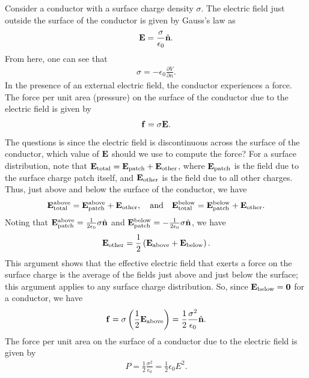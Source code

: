 Consider a conductor with a surface charge density $\sigma$. The electric field just outside the surface of the conductor is given by Gauss's law as
\begin{align}
    \mathbf{E} = \frac{\sigma}{\epsilon_{0}} \hat{\mathbf{n}}.
\end{align}
From here, one can see that
\begin{align}
    \sigma = -\epsilon_{0} \frac{\partial V}{\partial n}.
\end{align}
In the presence of an external electric field, the conductor experiences a force. The force per unit area (pressure) on the surface of the conductor due to the electric field is given by
\begin{align}
    \mathbf{f} = \sigma \mathbf{E}.
\end{align}
The questions is since the electric field is discontinuous across the surface of the conductor, which value of $\mathbf{E}$ should we use to compute the force? For a surface distribution, note that $\mathbf{E}_{\text{total}} = \mathbf{E}_{\text{patch}} + \mathbf{E}_{\text{other}}$, where $\mathbf{E}_{\text{patch}}$ is the field due to the surface charge patch itself, and $\mathbf{E}_{\text{other}}$ is the field due to all other charges. Thus, just above and below the surface of the conductor, we have
\begin{align}
    \mathbf{E}_{\text{total}}^{\text{above}} = \mathbf{E}_{\text{patch}}^{\text{above}} + \mathbf{E}_{\text{other}}, \quad \text{and} \quad \mathbf{E}_{\text{total}}^{\text{below}} = \mathbf{E}_{\text{patch}}^{\text{below}} + \mathbf{E}_{\text{other}}.
\end{align}
Noting that $\mathbf{E}_{\text{patch}}^{\text{above}} = \frac{1}{2\epsilon_{0}} \sigma \hat{\mathbf{n}}$ and $\mathbf{E}_{\text{patch}}^{\text{below}} = - \frac{1}{2\epsilon_{0}} \sigma \hat{\mathbf{n}}$, we have
\begin{align}
    \mathbf{E}_{\text{other}} = \frac{1}{2} \left( \mathbf{E}_{\text{above}} + \mathbf{E}_{\text{below}} \right).
\end{align}
This argument shows that the effective electric field that exerts a force on the surface charge is the average of the fields just above and just below the surface; this argument applies to any surface charge distribution. So, since $\mathbf{E}_{\text{below}} = \mathbf{0}$ for a conductor, we have
\begin{align}
    \mathbf{f} = \sigma \left( \frac{1}{2} \mathbf{E}_{\text{above}} \right) = \frac{1}{2} \frac{\sigma^{2}}{\epsilon_{0}} \hat{\mathbf{n}}.
\end{align}
The force per unit area on the surface of a conductor due to the electric field is given by
\begin{align}
    P = \frac{1}{2} \frac{\sigma^{2}}{\epsilon_{0}} = \frac{1}{2} \epsilon_{0} E^{2}.
\end{align}

